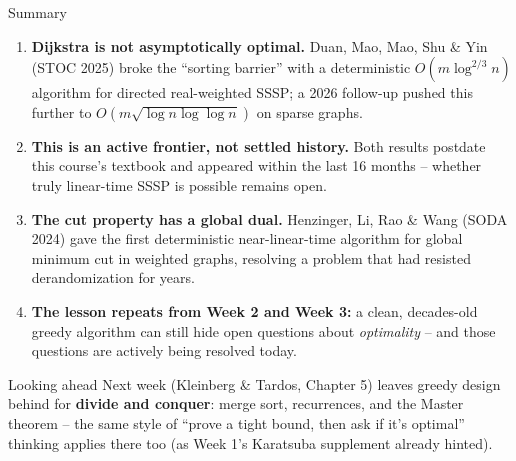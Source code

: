 \documentclass[11pt,aspectratio=169]{beamer}
\begin{document}
\begin{frame}{Summary}
  \small
  \begin{enumerate}
    \item \textbf{Dijkstra is not asymptotically optimal.} Duan, Mao, Mao, Shu \&
    Yin (STOC 2025) broke the ``sorting barrier'' with a deterministic
    $O(m\log^{2/3}n)$ algorithm for directed real-weighted SSSP; a 2026 follow-up
    pushed this further to $O(m\sqrt{\log n\log\log n})$ on sparse graphs.
    \item \textbf{This is an active frontier, not settled history.} Both results
    postdate this course's textbook and appeared within the last 16 months --
    whether truly linear-time SSSP is possible remains open.
    \item \textbf{The cut property has a global dual.} Henzinger, Li, Rao \&
    Wang (SODA 2024) gave the first deterministic near-linear-time algorithm for
    global minimum cut in weighted graphs, resolving a problem that had resisted
    derandomization for years.
    \item \textbf{The lesson repeats from Week 2 and Week 3:} a clean, decades-old
    greedy algorithm can still hide open questions about \emph{optimality} --
    and those questions are actively being resolved today.
  \end{enumerate}
  \begin{alertblock}{Looking ahead}
    Next week (Kleinberg \& Tardos, Chapter 5) leaves greedy design behind for
    \textbf{divide and conquer}: merge sort, recurrences, and the Master theorem
    -- the same style of ``prove a tight bound, then ask if it's optimal''
    thinking applies there too (as Week 1's Karatsuba supplement already hinted).
  \end{alertblock}
\end{frame}
\end{document}
